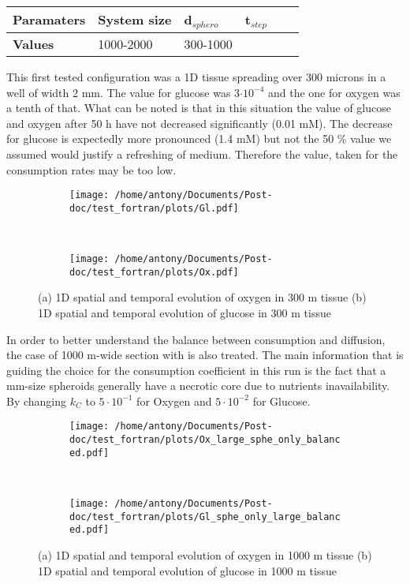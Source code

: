 \documentclass[11pt,a4paper]{article}
\begin{document}
\begin{center}
\begin{tabular}{ |p{20mm}|p{10mm}|p{10mm}|p{10mm}|p{10mm}|p{10mm}| }
\hline
\textbf{Paramaters} & System size & d$_{sphero}$ & t$_{step}$ \\
\hline
\textbf{Values} & 1000-2000 & 300-1000 & \\
\hline
\end{tabular}
\end{center}

This first tested configuration was a 1D tissue spreading over 300 microns in a well of width 2 mm. The value for glucose was 3$\cdot 10^{-4}$ and the one for oxygen was a tenth of that. What can be noted is that in this situation the value of glucose and oxygen after 50 h have not decreased significantly (0.01 mM). The decrease for glucose is expectedly more pronounced (1.4 mM) but not the 50 \% value we assumed would justify a refreshing of medium. Therefore the value, taken for the consumption rates may be too low. 

\begin{figure}[ht!]
	\begin{subfigure}{0.5\textwidth}
	\centering
	\texttt{[image: /home/antony/Documents/Post-doc/test\_fortran/plots/Gl.pdf]}
	\caption{\label{Gl}}
	\end{subfigure}
	~~
	\begin{subfigure}{0.5\textwidth}
	\centering
	\texttt{[image: /home/antony/Documents/Post-doc/test\_fortran/plots/Ox.pdf]}
	\caption{\label{Ox}}
	\end{subfigure}
	\caption{(a) 1D spatial and temporal evolution of oxygen in 300 \textmu m tissue (b) 1D spatial and temporal evolution of glucose in 300 \textmu m tissue}
\end{figure}

In order to better understand the balance between consumption and diffusion, the case of 1000 \textmu m-wide section with is also treated. The main information that is guiding  the choice for the consumption coefficient in this run is the fact that a mm-size spheroids generally have a necrotic core due to nutrients inavailability. By changing $k_C$ to $5 \cdot 10^{-1}$ for Oxygen and $5 \cdot 10^{-2}$ for Glucose.

\begin{figure}[ht!]
	\begin{subfigure}{0.5\textwidth}
	\centering
	\texttt{[image: /home/antony/Documents/Post-doc/test\_fortran/plots/Ox\_large\_sphe\_only\_balanced.pdf]}
	\caption{ \label{Ox_bal}}
	\end{subfigure}
	~~
	\begin{subfigure}{0.5\textwidth}
	\texttt{[image: /home/antony/Documents/Post-doc/test\_fortran/plots/Gl\_sphe\_only\_large\_balanced.pdf]}
		\caption{ \label{Gl_bal}}
	\end{subfigure}
	\caption{(a) 1D spatial and temporal evolution of oxygen in 1000 \textmu m tissue (b) 1D spatial and temporal evolution of glucose in 1000 \textmu m tissue}
\end{figure}
\end{document}
